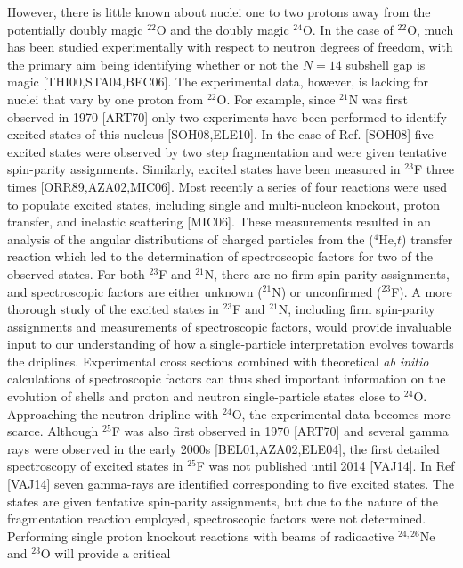 \documentclass[prc,preprint,superscriptaddress,showpacs,floatfix]{revtex4-1}
\begin{document}
However, there is little known about nuclei one to two protons away
from the potentially doubly magic $^{22}$O and the doubly magic
$^{24}$O.  In the case of $^{22}$O, much has been studied
experimentally with respect to neutron degrees of freedom, with the
primary aim being identifying whether or not the $N=14$ subshell gap
is magic [THI00,STA04,BEC06]. The experimental data, however, is
lacking for nuclei that vary by one proton from $^{22}$O. For example,
since $^{21}$N was first observed in 1970 [ART70] only two experiments
have been performed to identify excited states of this nucleus
[SOH08,ELE10]. In the case of Ref. [SOH08] five excited states were
observed by two step fragmentation and were given tentative
spin-parity assignments. Similarly, excited states have been measured
in $^{23}$F three times [ORR89,AZA02,MIC06]. Most recently a series of
four reactions were used to populate excited states, including single
and multi-nucleon knockout, proton transfer, and inelastic scattering
[MIC06]. These measurements resulted in an analysis of the angular
distributions of charged particles from the ($^{4}$He,$t$) transfer
reaction which led to the determination of spectroscopic factors for
two of the observed states. For both $^{23}$F and $^{21}$N, there are
no firm spin-parity assignments, and spectroscopic factors are either
unknown ($^{21}$N) or unconfirmed ($^{23}$F).  A more thorough study
of the excited states in $^{23}$F and $^{21}$N, including firm
spin-parity assignments and measurements of spectroscopic factors,
would provide invaluable input to our understanding of how a
single-particle interpretation evolves towards the
driplines. Experimental cross sections combined with theoretical {\em ab initio} 
calculations of spectroscopic factors can thus shed
important information on the evolution of shells and proton and
neutron single-particle states close to $^{24}$O.  Approaching the
neutron dripline with $^{24}$O, the experimental data becomes more
scarce. Although $^{25}$F was also first observed in 1970 [ART70] and
several gamma rays were observed in the early 2000s [BEL01,AZA02,ELE04], 
the first detailed spectroscopy of excited states
in $^{25}$F was not published until 2014 [VAJ14]. In Ref [VAJ14] seven
gamma-rays are identified corresponding to five excited states.  The
states are given tentative spin-parity assignments, but due to the
nature of the fragmentation reaction employed, spectroscopic factors
were not determined.  Performing single proton knockout reactions with
beams of radioactive $^{24,26}$Ne and $^{23}$O will provide a critical
\end{document}
